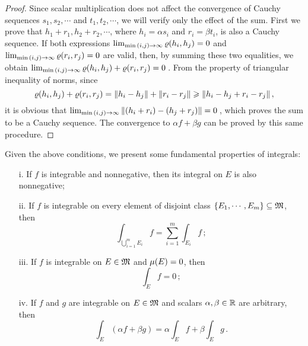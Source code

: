 {\footnotesize
\begin{proof}
Since scalar multiplication does not affect the convergence of Cauchy sequences $s_1,s_2,\cdots$ and $t_1,t_2,\cdots$, we will verify only the effect of the sum. First we prove that $  h_1+ r_1,h_2+ r_2,\cdots$, where $h_i=\alpha s_i$ and $r_i=\beta t_i$, is also a Cauchy sequence. If both expressions $\lim_{\min{\left (i,j\right )}\to\infty}{\varrho(h_i,h_j)}=0$ and $\lim_{\min{\left (i,j\right )}\to\infty}{\varrho(r_i,r_j)}=0$ are valid, then, by summing these two equalities, we obtain $\lim_{\min{\left (i,j\right )}\to\infty}\varrho(h_i,h_j)+\varrho(r_i,r_j)=0\,$. From the property of triangular inequality of norms, since
\begin{equation*}
\varrho(h_i,h_j)+\varrho(r_i,r_j) = \|h_i-h_j\| + \|r_i-r_j\| \geqslant \|h_i-h_j + r_i-r_j\|\,,
\end{equation*}
it is obvious that $\lim_{\min{\left (i,j\right )}\to\infty}\|(h_i+ r_i) -(h_j +r_j)\|=0\,$, which proves the sum to be a Cauchy sequence. The convergence to $\alpha f+\beta g$ can be  proved by this same procedure.
\end{proof}}

Given the above conditions, we present some fundamental properties of integrals:


\begin{itemize}
	\setlength\itemsep{.1em}
	\item[i.] If $f$ is integrable and nonnegative, then its integral on $E$ is also nonnegative;
	\item[ii.] If $f$ is integrable on every element of disjoint class $\{E_1,\cdots,E_m\}\subseteq \mathfrak{M}$, then
	\begin{equation}
	\int_{\bigcup_{i=1}^mE_i}f=\sum_{{i}=1}^{m} \int_{E_i}f\,;
	\end{equation}
	\item[iii.] If $f$ is integrable on $E\in\mathfrak{M}$ and $\mu(E)=0$, then
	\begin{equation}
	\int_{E}f =0\,;
	\end{equation}
	 \item[iv.] If $f$ and $g$ are integrable on $E\in\mathfrak{M}$ and scalars $\alpha,\beta\in\mathbb{R}$ are arbitrary, then
	 \begin{equation}
	 \int_{E}(\alpha f +\beta g) = \alpha\int_{E}f+\beta\int_{E}g \,.
	 \end{equation}
\end{itemize}


